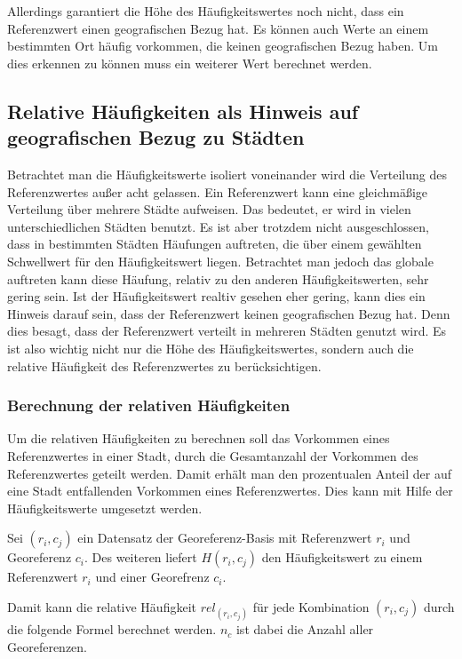 			Allerdings garantiert die Höhe des Häufigkeitswertes noch nicht, dass ein Referenzwert einen geografischen Bezug hat. 
			Es können auch Werte an einem bestimmten Ort häufig vorkommen, die keinen geografischen Bezug haben.
			Um dies erkennen zu können muss ein weiterer Wert berechnet werden.

		\subsection{Relative Häufigkeiten als Hinweis auf geografischen Bezug zu Städten}

			Betrachtet man die Häufigkeitswerte isoliert voneinander wird die Verteilung des Referenzwertes außer acht gelassen. 
			Ein Referenzwert kann eine gleichmäßige Verteilung über mehrere Städte aufweisen.
			Das bedeutet, er wird in vielen unterschiedlichen Städten benutzt. 
			Es ist aber trotzdem nicht ausgeschlossen, dass in bestimmten Städten Häufungen auftreten, die über einem gewählten Schwellwert für den Häufigkeitswert liegen.
			Betrachtet man jedoch das globale auftreten kann diese Häufung, relativ zu den anderen Häufigkeitswerten, sehr gering sein.
			Ist der Häufigkeitswert realtiv gesehen eher gering, kann dies ein Hinweis darauf sein, dass der Referenzwert keinen geografischen Bezug hat.
			Denn dies besagt, dass der Referenzwert verteilt in mehreren Städten genutzt wird.
			Es ist also wichtig nicht nur die Höhe des Häufigkeitswertes, sondern auch die relative Häufigkeit des Referenzwertes zu berücksichtigen.

			\subsubsection{Berechnung der relativen Häufigkeiten}  

				Um die relativen Häufigkeiten zu berechnen soll das Vorkommen eines Referenzwertes in einer Stadt, durch die Gesamtanzahl der Vorkommen des Referenzwertes geteilt werden.
				Damit erhält man den prozentualen Anteil der auf eine Stadt entfallenden Vorkommen eines Referenzwertes.
				Dies kann mit Hilfe der Häufigkeitswerte umgesetzt werden.

				Sei $(r_i,c_j)$ ein Datensatz der Georeferenz-Basis mit Referenzwert $r_i$ und Georeferenz $c_i$.
				Des weiteren liefert $H(r_{i},c_{j})$ den Häufigkeitswert zu einem Referenzwert $r_i$ und einer Georefrenz $c_i$. 

				Damit kann die relative Häufigkeit $rel_{(r_i,c_j)}$ für jede Kombination $(r_i,c_j)$ durch die folgende Formel berechnet werden. 
				$n_c$ ist dabei die Anzahl aller Georeferenzen.

